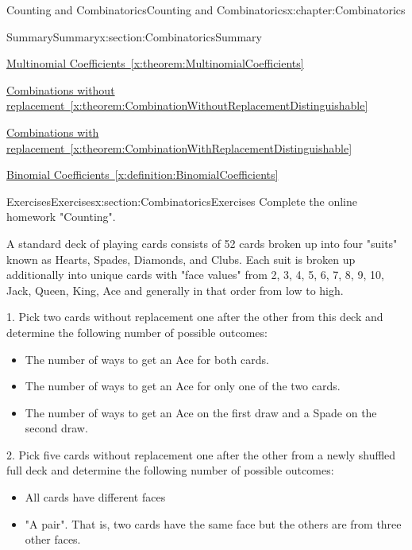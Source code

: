 \documentclass[oneside,10pt,]{book}
\newcommand{\xreffont}{\relax}
\numberwithin{equation}{section}
\begin{document}
\begin{chapterptx}{Counting and Combinatorics}{}{Counting and Combinatorics}{}{}{x:chapter:Combinatorics}
\begin{sectionptx}{Summary}{}{Summary}{}{}{x:section:CombinatoricsSummary}
\par
\hyperref[x:theorem:MultinomialCoefficients]{Multinomial Coefficients~{\xreffont\ref{x:theorem:MultinomialCoefficients}}}%
\par
\hyperref[x:theorem:CombinationWithoutReplacementDistinguishable]{Combinations without replacement~{\xreffont\ref{x:theorem:CombinationWithoutReplacementDistinguishable}}}%
\par
\hyperref[x:theorem:CombinationWithReplacementDistinguishable]{Combinations with replacement~{\xreffont\ref{x:theorem:CombinationWithReplacementDistinguishable}}}%
\par
\hyperref[x:definition:BinomialCoefficients]{Binomial Coefficients~{\xreffont\ref{x:definition:BinomialCoefficients}}}%
\end{sectionptx}
%
%
\typeout{************************************************}
\typeout{************************************************}
%
\begin{sectionptx}{Exercises}{}{Exercises}{}{}{x:section:CombinatoricsExercises}
Complete the online homework "Counting".%
\par
A standard deck of playing cards consists of 52 cards broken up into four "suits" known as Hearts, Spades, Diamonds, and Clubs. Each suit is broken up additionally into unique cards with "face values" from \textbraceleft{}2, 3, 4, 5, 6, 7, 8, 9, 10, Jack, Queen, King, Ace\textbraceright{} and generally in that order from low to high.%
\par
1.  Pick two cards without replacement one after the other from this deck and determine the following number of possible outcomes:%
\begin{itemize}[label=\textbullet]
\item{}The number of ways to get an Ace for both cards.%
\item{}The number of ways to get an Ace for only one of the two cards.%
\item{}The number of ways to get an Ace on the first draw and a Spade on the second draw.%
\end{itemize}
2.  Pick five cards without replacement one after the other from a newly shuffled full deck and determine the following number of possible outcomes:%
\begin{itemize}[label=\textbullet]
\item{}All cards have different faces%
\item{}"A pair". That is, two cards have the same face but the others are from three other faces.%

\end{itemize}
\end{sectionptx}
\end{chapterptx}
\end{document}
